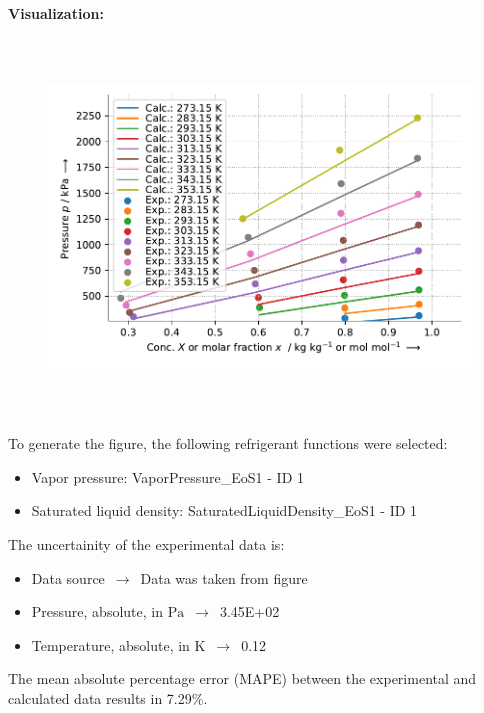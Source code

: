\textbf{Visualization:}
%
\begin{figure}[!htp]
{\noindent\includegraphics[height=10cm, keepaspectratio]{figs/abs/abs_R-12_paraffinic__NrtlFixedDg_1.pdf}}
\end{figure}
%

To generate the figure, the following refrigerant functions were selected:
\begin{itemize}
\item Vapor pressure: VaporPressure\_EoS1 - ID 1
\item Saturated liquid density: SaturatedLiquidDensity\_EoS1 - ID 1
\end{itemize}

The uncertainity of the experimental data is:
\begin{itemize}
\item Data source $\,\to\,$ Data was taken from figure
\item Pressure, absolute, in $\si{\pascal}$ $\,\to\,$ 3.45E+02
\item Temperature, absolute, in $\si{\kelvin}$ $\,\to\,$ 0.12
\end{itemize}

The mean absolute percentage error (MAPE) between the experimental and calculated data results in 7.29\%.
\FloatBarrier
\newpage
